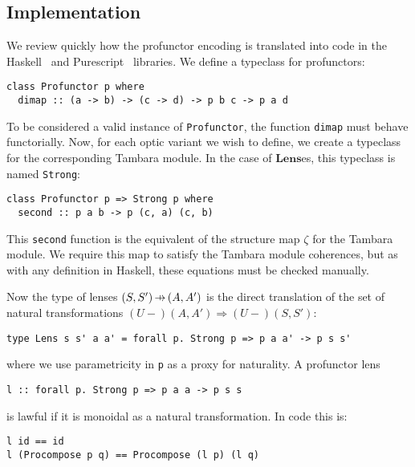 \documentclass[11pt,letterpaper]{article}
\theoremstyle{plain}
\theoremstyle{definition}
\newcommand{\Lens}{\mathbf{Lens}}
\newcommand{\Traversal}{\mathbf{Traversal}}
\newcommand{\hto}{\ensuremath{\,\mathaccent\shortmid\rightarrow\,}}
\begin{document}
\subsection{Implementation}
We review quickly how the profunctor encoding is translated into code in the Haskell~\cite{LensLibrary} and Purescript~\cite{PurescriptLibrary} libraries. We define a typeclass for profunctors:
\begin{verbatim}
class Profunctor p where
  dimap :: (a -> b) -> (c -> d) -> p b c -> p a d
\end{verbatim}
To be considered a valid instance of \texttt{Profunctor}, the function \texttt{dimap} must behave functorially. Now, for each optic variant we wish to define, we create a typeclass for the corresponding Tambara module. In the case of $\Lens$es, this typeclass is named \texttt{Strong}:
\begin{verbatim}
class Profunctor p => Strong p where
  second :: p a b -> p (c, a) (c, b)
\end{verbatim}
This \texttt{second} function is the equivalent of the structure map $\zeta$ for the Tambara module. We require this map to satisfy the Tambara module coherences, but as with any definition in Haskell, these equations must be checked manually.

Now the type of lenses $(S, S') \hto (A, A')$ is the direct translation of the set of natural transformations $(U-)(A,A') \Rightarrow (U-)(S,S')$:
\begin{verbatim}
type Lens s s' a a' = forall p. Strong p => p a a' -> p s s'
\end{verbatim}
where we use parametricity in \texttt{p} as a proxy for naturality. A profunctor lens 
\begin{verbatim}
l :: forall p. Strong p => p a a -> p s s
\end{verbatim}
is lawful if it is monoidal as a natural transformation. In code this is:
\begin{verbatim}
l id == id
l (Procompose p q) == Procompose (l p) (l q)
\end{verbatim}

%
%
\end{document}
